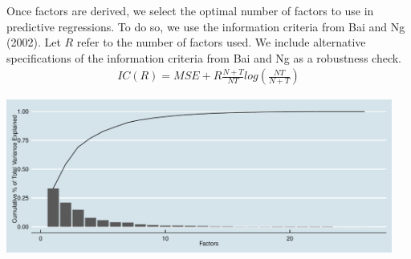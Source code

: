 \documentclass[11pt, letterpaper]{article}\usepackage[]{graphicx}\usepackage[]{color}
\begin{document}
Once factors are derived, we select the optimal number of factors to use in predictive regressions. To do so, we use the information criteria from Bai and Ng (2002). Let $R$ refer to the number of factors used. We include alternative specifications of the information criteria from Bai and Ng as a robustness check.
\begin{align*}
	IC(R) = MSE + R \frac{N+T}{NT} log\left(\frac{NT}{N+T}\right)
\end{align*}



{\centering \includegraphics[width=5in,height=2in]{figure/unnamed-chunk-5-1} 

}
\end{document}
